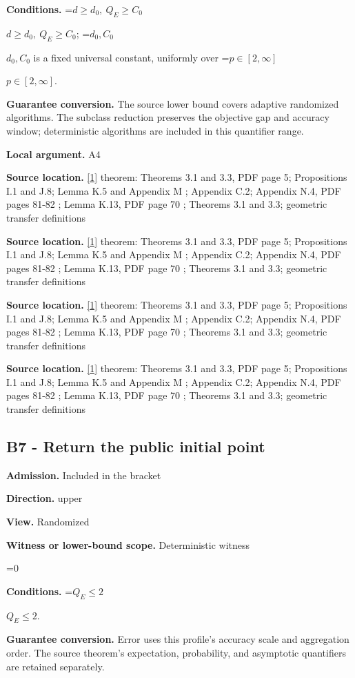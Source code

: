 \documentclass[10pt,a4paper]{article}
\newcommand{\AtlasMath}[1]{\par\begingroup\centering\setbox0=\hbox{$\displaystyle #1$}\ifdim\wd0>1.4\linewidth\typeout{ATLAS WIDE FORMULA: \the\wd0}\fi\ifdim\wd0>\linewidth\resizebox{\linewidth}{!}{\box0}\else\box0\fi\par\endgroup}
\newcommand{\AtlasInlineMath}[1]{\begingroup\setbox0=\hbox{$#1$}\ifdim\wd0>.4\linewidth\endgroup\AtlasMath{#1}\else\endgroup$#1$\fi}
\begin{document}
\textbf{Conditions.} \AtlasInlineMath{d\ge d_0,\ Q_E\ge C_0}; \AtlasInlineMath{d_0,C_0} is a fixed universal constant, uniformly over \AtlasInlineMath{p\in [2,\infty ]}.

\textbf{Guarantee conversion.} The source lower bound covers adaptive randomized algorithms. The subclass reduction preserves the objective gap and accuracy window; deterministic algorithms are included in this quantifier range.

\textbf{Local argument.} A4

\textbf{Source location.} \href{https://arxiv.org/html/2610.00345v1}{[1]} theorem: Theorems 3.1 and 3.3, PDF page 5; Propositions I.1 and J.8; Lemma K.5 and Appendix M ; Appendix C.2; Appendix N.4, PDF pages 81-82 ; Lemma K.13, PDF page 70 ; Theorems 3.1 and 3.3; geometric transfer definitions

\textbf{Source location.} \href{https://arxiv.org/html/2610.00345v1}{[1]} theorem: Theorems 3.1 and 3.3, PDF page 5; Propositions I.1 and J.8; Lemma K.5 and Appendix M ; Appendix C.2; Appendix N.4, PDF pages 81-82 ; Lemma K.13, PDF page 70 ; Theorems 3.1 and 3.3; geometric transfer definitions

\textbf{Source location.} \href{https://arxiv.org/html/2610.00345v1}{[1]} theorem: Theorems 3.1 and 3.3, PDF page 5; Propositions I.1 and J.8; Lemma K.5 and Appendix M ; Appendix C.2; Appendix N.4, PDF pages 81-82 ; Lemma K.13, PDF page 70 ; Theorems 3.1 and 3.3; geometric transfer definitions

\textbf{Source location.} \href{https://arxiv.org/html/2610.00345v1}{[1]} theorem: Theorems 3.1 and 3.3, PDF page 5; Propositions I.1 and J.8; Lemma K.5 and Appendix M ; Appendix C.2; Appendix N.4, PDF pages 81-82 ; Lemma K.13, PDF page 70 ; Theorems 3.1 and 3.3; geometric transfer definitions

\subsection{B7 - Return the public initial point}
\textbf{Admission.} Included in the bracket

\textbf{Direction.} upper

\textbf{View.} Randomized

\textbf{Witness or lower-bound scope.} Deterministic witness

\AtlasMath{0}
\textbf{Conditions.} \AtlasInlineMath{Q_E\le 2}.

\textbf{Guarantee conversion.} Error uses this profile's accuracy scale and aggregation order. The source theorem's expectation, probability, and asymptotic quantifiers are retained separately.
\end{document}
